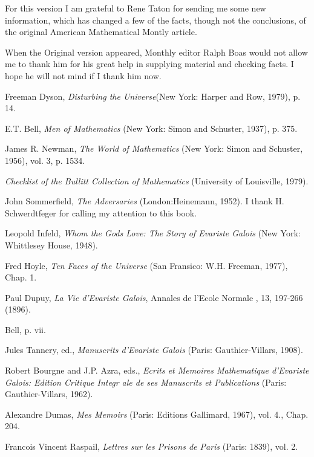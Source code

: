 \documentclass[12pt]{article}
\begin{document}
For this version I am grateful to Rene Taton for sending me some new information, which has changed a few of the facts, though not the conclusions, of the original American Mathematical Montly article.

When the Original version appeared, Monthly editor Ralph Boas would not allow me to thank him for his great help in supplying material and checking facts. I hope he will not mind if I thank him now. 

\renewcommand{\refname}{Notes}

\begin{thebibliography}{9999}
\small

 Freeman Dyson, \emph{Disturbing the Universe}(New York: Harper and Row, 1979), p. 14. 

 E.T. Bell, {\it Men of Mathematics} (New York: Simon and Schuster, 1937), p. 375. 

 James R. Newman, {\it The World of Mathematics} (New York: Simon and Schuster, 1956), vol. 3, p. 1534. 

 \emph{Checklist of the Bullitt Collection of Mathematics} (University of Louisville, 1979). 

 John Sommerfield, \emph{The Adversaries} (London:Heinemann, 1952). I thank H. Schwerdtfeger for calling my attention to
this book. 

 Leopold Infeld, \emph{Whom the Gods Love: The Story of Evariste Galois} (New York: Whittlesey House, 1948). 

 Fred Hoyle, \emph{Ten Faces of the Universe} (San Fransico: W.H. Freeman, 1977), Chap. 1. 

 Paul Dupuy, \emph{La Vie d'Evariste Galois}, Annales de l'Ecole Normale , 13, 197-266 (1896). 

 Bell, p. vii. 

 Jules Tannery, ed., \emph{Manuscrits d'Evariste Galois} (Paris: Gauthier-Villars, 1908). 

 Robert Bourgne and J.P. Azra, eds., \emph{Ecrits et Memoires Mathematique d'Evariste Galois: Edition Critique Integr
ale de ses Manuscrits et Publications} (Paris: Gauthier-Villars, 1962). 

 Alexandre Dumas, \emph{Mes Memoirs} (Paris: Editions Gallimard, 1967), vol. 4., Chap. 204. 

 Francois Vincent Raspail, \emph{Lettres sur les Prisons de Paris} (Paris: 1839), vol. 2. 


\end{thebibliography}
\end{document}
